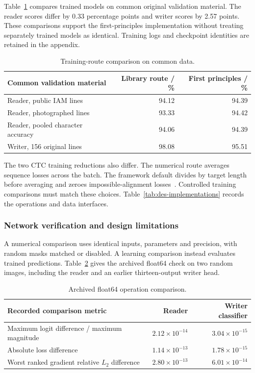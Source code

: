 Table~\ref{tab:dis-training} compares trained models on common original validation material. The reader scores differ by 0.33 percentage points and writer scores by 2.57 points. These comparisons support the first-principles implementation without treating separately trained models as identical. Training logs and checkpoint identities are retained in the appendix.
\begin{table}[!htbp]\centering\small
\begin{tabularx}{\linewidth}{Xrr}\toprule
\textbf{Common validation material}&\textbf{Library route / \%}&\textbf{First principles / \%}\\\midrule
Reader, public IAM lines&94.12&94.39\\
Reader, photographed lines&93.33&94.42\\
Reader, pooled character accuracy&94.06&94.39\\
Writer, 156 original lines&98.08&95.51\\\bottomrule
\end{tabularx}
\caption{Training-route comparison on common data.}
\label{tab:dis-training}
\end{table}

The two CTC training reductions also differ. The numerical route averages sequence losses across the batch. The framework default divides by target length before averaging and zeroes impossible-alignment losses~\cite{pytorchctc}. Controlled training comparisons must match these choices. Table~\ref{tab:des-implementations} records the operations and data interfaces.

\subsubsection{Network verification and design limitations}
\label{sec:des-netverify}
A numerical comparison uses identical inputs, parameters and precision, with random masks matched or disabled. A learning comparison instead evaluates trained predictions. Table~\ref{tab:des-numericalcheck} gives the archived float64 check on two random images, including the reader and an earlier thirteen-output writer head.
\begin{table}[H]\centering\small
\begin{tabularx}{\linewidth}{|X|r|r|}
\hline\textbf{Recorded comparison metric}&\textbf{Reader}&\textbf{Writer classifier}\\\hline
Maximum logit difference / maximum magnitude&$2.12\times10^{-14}$&$3.04\times10^{-15}$\\\hline
Absolute loss difference&$1.14\times10^{-13}$&$1.78\times10^{-15}$\\\hline
Worst ranked gradient relative $L_2$ difference&$2.80\times10^{-13}$&$6.01\times10^{-14}$\\\hline
\end{tabularx}
\caption{Archived float64 operation comparison.}
\label{tab:des-numericalcheck}
\end{table}


